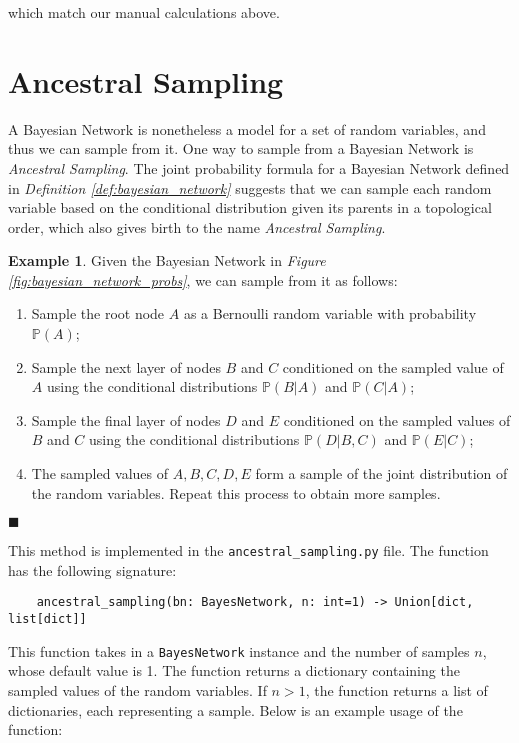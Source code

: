 \documentclass{article}
\theoremstyle{definition}
\newtheorem{example}{Example}
\newenvironment{exampleqed}
    {\begin{example}}
    {\hfill \qedsymbol \end{example}}
\renewcommand{\qedsymbol}{\(\blacksquare\)}
\renewcommand{\P}{\mathbb{P}}
\begin{document}
which match our manual calculations above.

\pagebreak

\section{Ancestral Sampling}

A Bayesian Network is nonetheless a model for a set of random variables, and thus we can sample from it. One way to sample from a Bayesian Network is \textit{Ancestral Sampling}. The joint probability formula for a Bayesian Network defined in \textit{Definition \ref{def:bayesian_network}} suggests that we can sample each random variable based on the conditional distribution given its parents in a topological order, which also gives birth to the name \textit{Ancestral Sampling}.

\begin{exampleqed}
    Given the Bayesian Network in \textit{Figure \ref{fig:bayesian_network_probs}}, we can sample from it as follows:
    \begin{enumerate}
        \item Sample the root node \(A\) as a Bernoulli random variable with probability \(\P(A)\);
        \item Sample the next layer of nodes \(B\) and \(C\) conditioned on the sampled value of \(A\) using the conditional distributions \(\P(B|A)\) and \(\P(C|A)\);
        \item Sample the final layer of nodes \(D\) and \(E\) conditioned on the sampled values of \(B\) and \(C\) using the conditional distributions \(\P(D|B,C)\) and \(\P(E|C)\);
        \item The sampled values of \(A, B, C, D, E\) form a sample of the joint distribution of the random variables. Repeat this process to obtain more samples.
    \end{enumerate}
\end{exampleqed}

This method is implemented in the \texttt{ancestral\_sampling.py} file. The function has the following signature:

\begin{verbatim}
    ancestral_sampling(bn: BayesNetwork, n: int=1) -> Union[dict, list[dict]]
\end{verbatim}

This function takes in a \texttt{BayesNetwork} instance and the number of samples \(n\), whose default value is 1. The function returns a dictionary containing the sampled values of the random variables. If \(n > 1\), the function returns a list of dictionaries, each representing a sample. Below is an example usage of the function:
\end{document}
